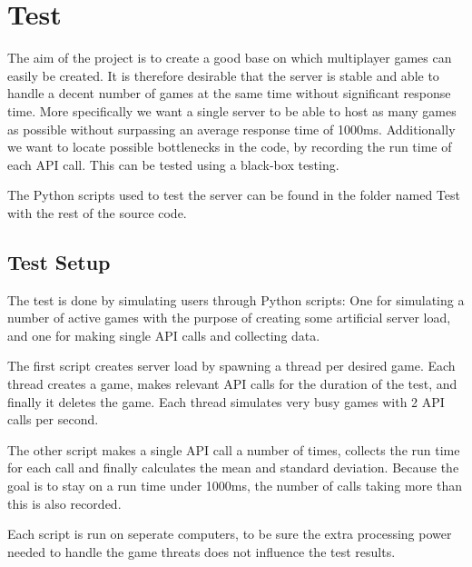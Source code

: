 \section{Test}
The aim of the project is to create a good base on which multiplayer games can easily be created. It is therefore desirable that the server is stable and able to handle a decent number of games at the same time without significant response time. More specifically we want a single server to be able to host as many games as possible without surpassing an average response time of 1000ms. Additionally we want to locate possible bottlenecks in the code, by recording the run time of each API call. This can be tested using a black-box testing.

The Python scripts used to test the server can be found in the folder named Test with the rest of the source code.

\subsection{Test Setup}
\label{sec:testSetup}
The test is done by simulating users through Python scripts: One for simulating a number of active games with the purpose of creating some artificial server load, and one for making single API calls and collecting data.

The first script creates server load by spawning a thread per desired game. Each thread creates a game, makes relevant API calls for the duration of the test, and finally it deletes the game. Each thread simulates very busy games with 2 API calls per second. 

The other script makes a single API call a number of times, collects the run time for each call and finally calculates the mean and standard deviation. Because the goal is to stay on a run time under 1000ms, the number of calls taking more than this is also recorded.

Each script is run on seperate computers, to be sure the extra processing power needed to handle the game threats does not influence the test results. 


